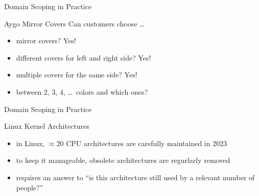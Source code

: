 
\begin{frame}{Domain Scoping in Practice}
	\begin{fancycolumns}[widths={70},animation=none]
		\centering{}
	\nextcolumn
		\begin{example}{Aygo Mirror Covers}
			Can customers choose \ldots
			\begin{itemize}
				\item mirror covers? Yes!
				\item different covers for left and right side? Yes!
				\item multiple covers for the same side? Yes!
				\item between 2, 3, 4, \ldots\ colors and which ones?
			\end{itemize}
		\end{example}
	\end{fancycolumns}
\end{frame}

\begin{frame}{Domain Scoping in Practice}
	\begin{fancycolumns}[widths={70},animation=none]
		\centering{}
	\nextcolumn
		\begin{example}{Linux Kernel Architectures}
			\begin{itemize}
				\item in Linux, $\approx 20$ CPU architectures are carefully maintained in 2023
				\item to keep it manageable, obsolete architectures are regurlarly removed
				\item requires an answer to ``is this architecture still used by a relevant number of people?''
			\end{itemize}
		\end{example}
	\end{fancycolumns}
\end{frame}

